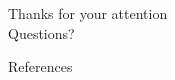 \documentclass[aspectratio=169]{ISAE-Beamer}
\begin{document}
\begin{frame}{}
\centering

\Huge Thanks for your attention \\
\Huge Questions?
\end{frame}

\begin{frame}[allowframebreaks]{References}
\printbibliography
\end{frame}
\end{document}
